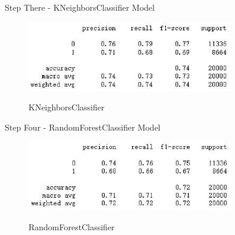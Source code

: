 \documentclass[
size=14pt,
paper=smartboard,  %
mode=present, 		%
display=slides, 	%
style=tuliplab,  	%
pauseslide,
fleqn,leqno]{powerdot}
\begin{document}
	
	\begin{slide}[toc=,bm=]{Step There - KNeighborsClassifier Model}
		\begin{figure}
			\centering
			\includegraphics[width=0.8\textwidth]{figures//fig9.eps}\\
			\caption{KNeighborsClassifier}
		\end{figure}
	\end{slide}
	
	
	\begin{slide}[toc=,bm=]{Step Four - RandomForestClassifier Model}
		\begin{figure}
			\centering
			\includegraphics[width=0.8\textwidth]{figures//fig10.eps}\\
			\caption{RandomForestClassifier}
		\end{figure}
	\end{slide}
	
\end{document}
